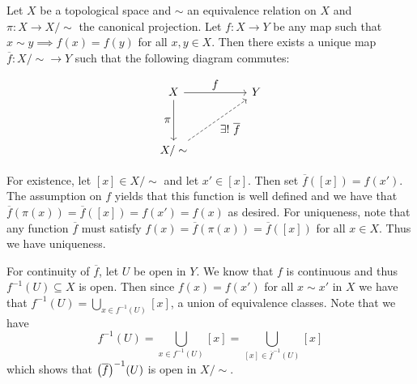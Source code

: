 \documentclass[letterpaper, 11pt, oneside]{book}
\begin{document}
\begin{prop}
  Let $X$ be a topological space and $\sim$ an equivalence relation on $X$ and $\pi\colon X \to X / \sim$ the canonical projection.
  Let $f\colon X \to Y$ be any map such that $x \sim y \implies f(x) = f(y)$ for all $x, y \in X$.
  Then there exists a unique map $\overline{f}\colon X / \sim \to Y$ such that the following diagram commutes:
  \begin{figure}[h]
    \centering
    \[
      \begin{tikzcd}[every label/.append style={font=\normalsize}]
        X && Y \\
        \\
        {X / \sim}
        \arrow["f", from=1-1, to=1-3]
        \arrow["\pi"', from=1-1, to=3-1]
        \arrow["{\exists!~\overline{f}}"', dashed, from=3-1, to=1-3]
      \end{tikzcd}
    \]
    \addtocounter{figure}{1}
  \end{figure}
\end{prop}
\begin{pf}
  For existence, let $[x] \in X / \sim$ and let $x' \in [x]$.
  Then set $\overline{f}([x]) = f(x')$.
  The assumption on $f$ yields that this function is well defined and we have that $\overline{f}(\pi(x)) = \overline{f}([x]) = f(x') = f(x)$ as desired.
  For uniqueness, note that any function $\overline{f}$ must satisfy $f(x) = \overline{f}(\pi(x)) = \overline{f}([x])$ for all $x \in X$.
  Thus we have uniqueness.

  For continuity of $\overline{f}$, let $U$ be open in $Y$.
  We know that $f$ is continuous and thus $f^{-1}(U) \subseteq X$ is open.
  Then since $f(x) = f(x')$ for all $x \sim x'$ in $X$ we have that $f^{-1}(U) = \bigcup_{x \in f^{-1}(U)} [x]$, a union of equivalence classes.
  Note that we have
  \[
    f^{-1}(U) = \bigcup_{x \in f^{-1}(U)} [x] = \bigcup_{[x] \in \overline{f}^{-1}(U)} [x]
  \]
  which shows that $\pqty{\overline{f}}^{-1}(U)$ is open in $X / \sim$.
\end{pf}

\clearpage
\end{document}
